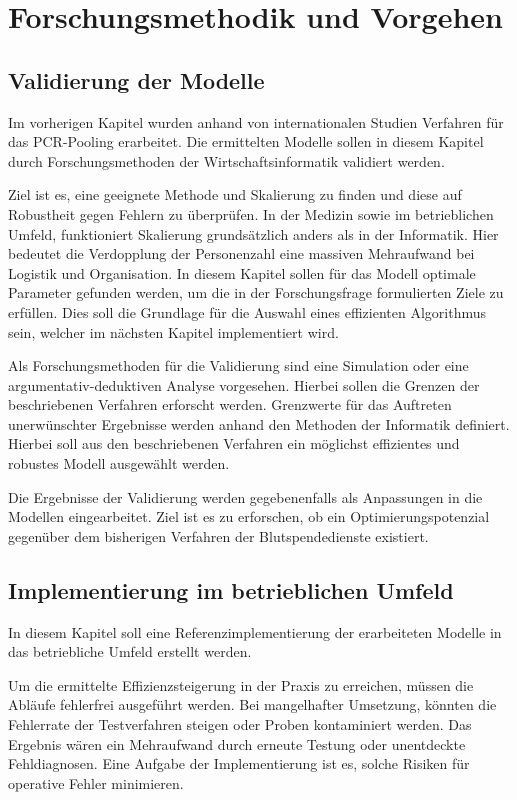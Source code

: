 
\chapter{Forschungsmethodik und Vorgehen}
\section{Validierung der Modelle}
Im vorherigen Kapitel wurden anhand von internationalen Studien Verfahren für das PCR-Pooling erarbeitet.
Die ermittelten Modelle sollen in diesem Kapitel durch Forschungsmethoden der Wirtschaftsinformatik validiert werden.

Ziel ist es, eine geeignete Methode und Skalierung zu finden und diese auf Robustheit gegen Fehlern zu überprüfen.
In der Medizin sowie im betrieblichen Umfeld, funktioniert Skalierung grundsätzlich anders als in der Informatik.
Hier bedeutet die Verdopplung der Personenzahl eine massiven Mehraufwand bei Logistik und Organisation.
In diesem Kapitel sollen für das Modell optimale Parameter gefunden werden, um die in der Forschungsfrage formulierten Ziele zu erfüllen.
Dies soll die Grundlage für die Auswahl eines effizienten Algorithmus sein, welcher im nächsten Kapitel implementiert wird.

Als Forschungsmethoden für die Validierung sind eine Simulation oder eine argumentativ-deduktiven Analyse vorgesehen.
Hierbei sollen die Grenzen der beschriebenen Verfahren erforscht werden.
Grenzwerte für das Auftreten unerwünschter Ergebnisse werden anhand den Methoden der Informatik definiert.
Hierbei soll aus den beschriebenen Verfahren ein möglichst effizientes und robustes Modell ausgewählt werden.

Die Ergebnisse der Validierung werden gegebenenfalls als Anpassungen in die Modellen eingearbeitet.
Ziel ist es zu erforschen, ob ein Optimierungspotenzial gegenüber dem bisherigen Verfahren der Blutspendedienste existiert.

\section{Implementierung im betrieblichen Umfeld}
In diesem Kapitel soll eine Referenzimplementierung der erarbeiteten Modelle in das betriebliche Umfeld erstellt werden.

Um die ermittelte Effizienzsteigerung in der Praxis zu erreichen, müssen die Abläufe fehlerfrei ausgeführt werden.
Bei mangelhafter Umsetzung, könnten die Fehlerrate der Testverfahren steigen oder Proben kontaminiert werden.
Das Ergebnis wären ein Mehraufwand durch erneute Testung oder unentdeckte Fehldiagnosen.
Eine Aufgabe der Implementierung ist es, solche Risiken für operative Fehler minimieren.

